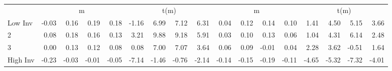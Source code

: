 \begin{table}[!ht]
\begin{tabular}{lrrrrrrrrrrrrrrrr}
  
    
      & \multicolumn{4}{c}{m} & \multicolumn{4}{c}{t(m)}
    
      & \multicolumn{4}{c}{m} & \multicolumn{4}{c}{t(m)}
    
    \\
      \cmidrule(r){2-5} \cmidrule(r){6-9} \cmidrule(r){10-13} \cmidrule(r){14-17}

    Low Inv   & -0.03  & 0.16  & 0.19  & 0.18  & -1.16  & 6.99  & 7.12  & 6.31  & 0.04  & 0.12  & 0.14  & 0.10  & 1.41  & 4.50  & 5.15  & 3.66  \\
           2  & 0.08  & 0.18  & 0.16  & 0.13  & 3.21  & 9.88  & 9.18  & 5.91  & 0.03  & 0.10  & 0.13  & 0.06  & 1.04  & 4.31  & 6.14  & 2.48  \\
           3  & 0.00  & 0.13  & 0.12  & 0.08  & 0.08  & 7.00  & 7.07  & 3.64  & 0.06  & 0.09  & -0.01  & 0.04  & 2.28  & 3.62  & -0.51  & 1.64  \\
    High Inv  & -0.23  & -0.03  & -0.01  & -0.05  & -7.14  & -1.46  & -0.76  & -2.14  & -0.14  & -0.15  & -0.19  & -0.11  & -4.65  & -5.32  & -7.32  & -4.01  \\

  

  \bottomrule
\end{tabular}
\label{tbl:32_Size_OP_Inv_C1997b}
\end{table}